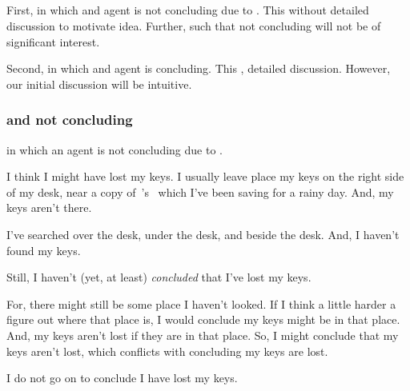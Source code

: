 \subsection{}
\label{sec:illu3}

\begin{note}
  First,  in which \requ{} and agent is not concluding due to \requ{}.
  This  without detailed discussion to motivate idea.
  Further,  such that not concluding will not be of significant interest.

  Second,  in which \requ{} and agent is concluding.
  This , detailed discussion.
  However, our initial discussion will be intuitive.
\end{note}

\subsubsection{ and not concluding}

\begin{note}
   in which an agent is not concluding due to \requ{}.
\end{note}

\begin{note}
  \begin{illustration}
    \label{illu:lost-key}
    I think I might have lost my keys.
    I usually leave place my keys on the right side of my desk, near a copy of~\citeauthor{Vickers:1989tr}'s~ which I've been saving for a rainy day.
    And, my keys aren't there.

    I've searched over the desk, under the desk, and beside the desk.
    And, I haven't found my keys.

    Still, I haven't (yet, at least) \emph{concluded} that I've lost my keys.

    For, there might still be some place I haven't looked.
    If I think a little harder a figure out where that place is, I would conclude my keys might be in that place.
    And, my keys aren't lost if they are in that place.
    So, I might conclude that my keys aren't lost, which conflicts with concluding my keys are lost.

    I do not go on to conclude I have lost my keys.
  \end{illustration}
\end{note}

